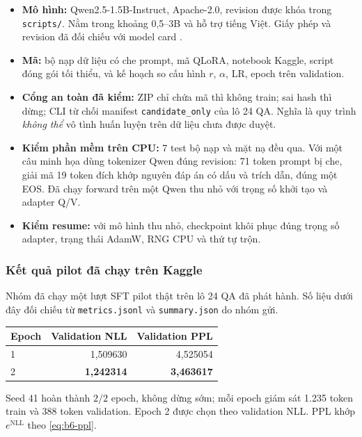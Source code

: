 \begin{itemize}[leftmargin=2em]
\item \textbf{Mô hình:} Qwen2.5-1.5B-Instruct, Apache-2.0, revision được khóa
trong \texttt{scripts/}. Nằm trong khoảng 0,5--3B và hỗ trợ tiếng Việt. Giấy phép
và revision đã đối chiếu với model card \cite{qwen}.
\item \textbf{Mã:} bộ nạp dữ liệu có che prompt, mã QLoRA, notebook Kaggle, script
đóng gói tối thiểu, và kế hoạch so cấu hình $r$, $\alpha$, LR, epoch trên
validation.
\item \textbf{Cổng an toàn đã kiểm:} ZIP chỉ chứa mã thì không train; sai hash thì
dừng; CLI từ chối manifest \texttt{candidate\_only} của lô 24 QA. Nghĩa là quy
trình \emph{không thể} vô tình huấn luyện trên dữ liệu chưa được duyệt.
\item \textbf{Kiểm phần mềm trên CPU:} 7 test bộ nạp và mặt nạ đều qua. Với một câu
minh họa dùng tokenizer Qwen đúng revision: 71 token prompt bị che, giải mã 19
token đích khớp nguyên đáp án có dấu và trích dẫn, đúng một EOS. Đã chạy forward
trên một Qwen thu nhỏ với trọng số khởi tạo và adapter Q/V.
\item \textbf{Kiểm resume:} với mô hình thu nhỏ, checkpoint khôi phục đúng trọng số
adapter, trạng thái AdamW, RNG CPU và thứ tự trộn.
\end{itemize}

\subsubsection{Kết quả pilot đã chạy trên Kaggle \dalam}

Nhóm đã chạy một lượt SFT pilot thật trên lô 24 QA đã phát hành. Số liệu dưới đây
đối chiếu từ \texttt{metrics.jsonl} và \texttt{summary.json} do nhóm gửi.

\begin{center}
\begin{tabular}{lrr}
\toprule
\textbf{Epoch} & \textbf{Validation NLL} & \textbf{Validation PPL}\\
\midrule
1 & 1,509630 & 4,525054\\
2 & \textbf{1,242314} & \textbf{3,463617}\\
\bottomrule
\end{tabular}
\end{center}

Seed 41 hoàn thành $2/2$ epoch, không dừng sớm; mỗi epoch giám sát 1.235 token
train và 388 token validation. Epoch 2 được chọn theo validation NLL. PPL khớp
$e^{\mathrm{NLL}}$ theo \eqref{eq:b6-ppl}.

